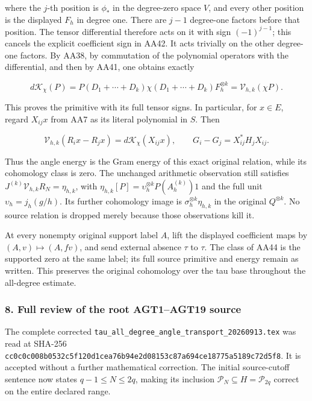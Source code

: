 \documentclass{article}
\begin{document}
where the \(j\)-th position is \(\phi_*\) in the degree-zero space \(V\), and every other position is the displayed \(F_h\) in degree one. There are \(j-1\) degree-one factors before that position. The tensor differential therefore acts on it with sign \((-1)^{j-1}\); this cancels the explicit coefficient sign in AA42. It acts trivially on the other degree-one factors. By AA38, by commutation of the polynomial operators with the differential, and then by AA41, one obtains exactly

\[
d\mathcal K_\chi(P)
=P(D_1+\cdots+D_k)\chi(D_1+\cdots+D_k)F_h^{\otimes k}
=\mathcal V_{h,k}(\chi P).
\tag{AA43}
\]

This proves the primitive with its full tensor signs. In particular, for \(x\in E\), regard \(X_{ij}x\) from AA7 as its literal polynomial in \(S\). Then

\[
\mathcal V_{h,k}(R_ix-R_jx)
=d\mathcal K_\chi(X_{ij}x),\qquad
G_i-G_j=X_{ij}^*H_jX_{ij}.
\tag{AA44}
\]

Thus the angle energy is the Gram energy of this exact original relation, while its cohomology class is zero. The unchanged arithmetic observation still satisfies \(J^{(k)}\mathcal V_{h,k}R_N=\eta_{h,k}\), with \(\eta_{h,k}[P]=\upsilon_h^{\otimes k}P(A_h^{(k)})1\) and the full unit \(\upsilon_h=j_h(g/h)\). Its further cohomology image is \(\sigma_h^{\otimes k}\eta_{h,k}\) in the original \(Q^{\otimes k}\). No source relation is dropped merely because those observations kill it.

At every nonempty original support label \(A\), lift the displayed coefficient maps by \((A,v)\mapsto(A,fv)\), and send external absence \(\tau\) to \(\tau\). The class of AA44 is the supported zero at the same label; its full source primitive and energy remain as written. This preserves the original cohomology over the tau base throughout the all-degree estimate.

\subsubsection{8. Full review of the root AGT1--AGT19 source}\label{endpoint-all_degree_angle_review--full-review-of-the-root-agt1agt19-source}

The complete corrected \nolinkurl{tau_all_degree_angle_transport_20260913.tex} was read at SHA-256 \nolinkurl{cc0c0c008b0532c5f120d1cea76b94e2d08153c87a694ce18775a5189c72d5f8}. It is accepted without a further mathematical correction. The initial source-cutoff sentence now states \(q-1\le N\le2q\), making its inclusion \(\mathcal P_N\subseteq H=\mathcal P_{2q}\) correct on the entire declared range.
\end{document}
